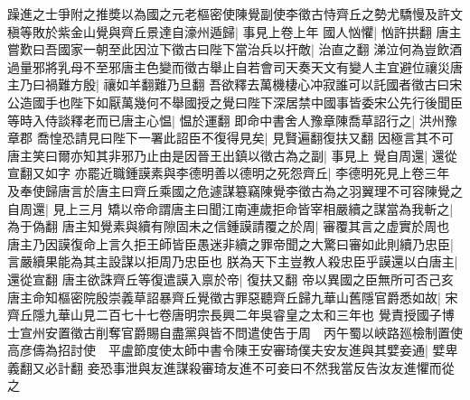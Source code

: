 躁進之士爭附之推奬以為國之元老樞密使陳覺副使李徵古恃齊丘之勢尤驕慢及許文稹等敗於紫金山覺與齊丘景達自濠州遁歸|{
	事見上卷上年}
國人忷懼|{
	忷許拱翻}
唐主嘗歎曰吾國家一朝至此因泣下徵古曰陛下當治兵以扞敵|{
	治直之翻}
涕泣何為豈飲酒過量邪將乳母不至邪唐主色變而徵古舉止自若會司天奏天文有變人主宜避位禳災唐主乃曰禍難方殷|{
	禳如羊翻難乃旦翻}
吾欲釋去萬機棲心冲寂誰可以託國者徵古曰宋公造國手也陛下如厭萬幾何不舉國授之覺曰陛下深居禁中國事皆委宋公先行後聞臣等時入侍談釋老而已唐主心愠|{
	愠於運翻}
即命中書舍人豫章陳喬草詔行之|{
	洪州豫章郡}
喬惶恐請見曰陛下一署此詔臣不復得見矣|{
	見賢遍翻復扶又翻}
因極言其不可唐主笑曰爾亦知其非邪乃止由是因晉王出鎮以徵古為之副|{
	事見上}
覺自周還|{
	還從宣翻又如字}
亦罷近職鍾謨素與李德明善以德明之死怨齊丘|{
	李德明死見上卷三年}
及奉使歸唐言於唐主曰齊丘乘國之危遽謀簒竊陳覺李徵古為之羽翼理不可容陳覺之自周還|{
	見上三月}
矯以帝命謂唐主曰聞江南連歲拒命皆宰相嚴續之謀當為我斬之|{
	為于偽翻}
唐主知覺素與續有隙固未之信鍾謨請覆之於周|{
	審覆其言之虚實於周也}
唐主乃因謨復命上言久拒王師皆臣愚迷非續之罪帝聞之大驚曰審如此則續乃忠臣|{
	言嚴續果能為其主設謀以拒周乃忠臣也}
朕為天下主豈教人殺忠臣乎謨還以白唐主|{
	還從宣翻}
唐主欲誅齊丘等復遣謨入禀於帝|{
	復扶又翻}
帝以異國之臣無所可否己亥唐主命知樞密院殷崇義草詔暴齊丘覺徵古罪惡聽齊丘歸九華山舊隱官爵悉如故|{
	宋齊丘隱九華山見二百七十七卷唐明宗長興二年吳睿皇之太和三年也}
覺責授國子博士宣州安置徵古削奪官爵賜自盡黨與皆不問遣使告于周　丙午蜀以峽路廵檢制置使高彦儔為招討使　平盧節度使太師中書令陳王安審琦僕夫安友進與其嬖妾通|{
	嬖卑義翻又必計翻}
妾恐事泄與友進謀殺審琦友進不可妾曰不然我當反告汝友進懼而從之

